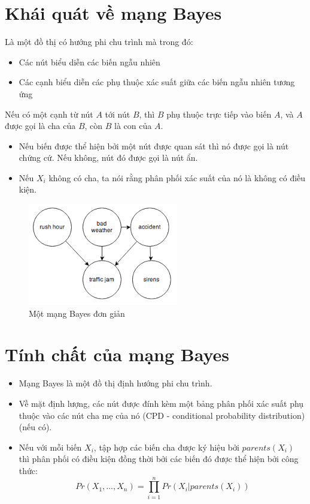 \documentclass[12pt]{report}
\begin{document}
%

\newpage
\setcounter{page}{1}

\tableofcontents 
\newpage

\section{Khái quát về mạng Bayes}
Là một đồ thị có hướng phi chu trình mà trong đó:
\begin{itemize}
\item Các nút biểu diễn các biến ngẫu nhiên
\item Các cạnh biểu diễn các phụ thuộc xác suất giữa các biến ngẫu nhiên tương ứng
\end{itemize}
Nếu có một cạnh từ nút $A$ tới nút $B$, thì $B$ phụ thuộc trực tiếp vào biến $A$, và $A$ được 
gọi là cha của $B$, còn $B$ là con của $A$.
\begin{itemize}
\item Nếu biến được thể hiện bởi một nút được quan sát thì nó được gọi là nút chứng cứ.
Nếu không, nút đó được gọi là nút ẩn.
\item Nếu $X_i$ không có cha, ta nói rằng phân phối xác suất của nó là không có điều kiện. 
\end{itemize}
\begin{figure}[h]
\centering
\includegraphics[scale=1]{mang-bayesian.png}
\caption{Một mạng Bayes đơn giản}
\end{figure}

\section{Tính chất của mạng Bayes}
\begin{itemize}
\item Mạng Bayes là một đồ thị định hướng phi chu trình.
\item Về mặt định lượng, các nút được đính kèm một bảng phân phối xác suất phụ 
thuộc vào các nút cha mẹ của nó (CPD - conditional probability distribution) (nếu có).
\item Nếu với mỗi biến $X_i$, tập hợp các biến cha được ký hiệu bởi $parents(X_i)$ thì phân
phối có điều kiện đồng thời bởi các biến  đó được thể hiện bởi công thức: 
$$Pr(X_1, ..., X_n) = \prod_{i=1}^n Pr(X_i | parents(X_i))$$
\end{itemize}
\end{document}
